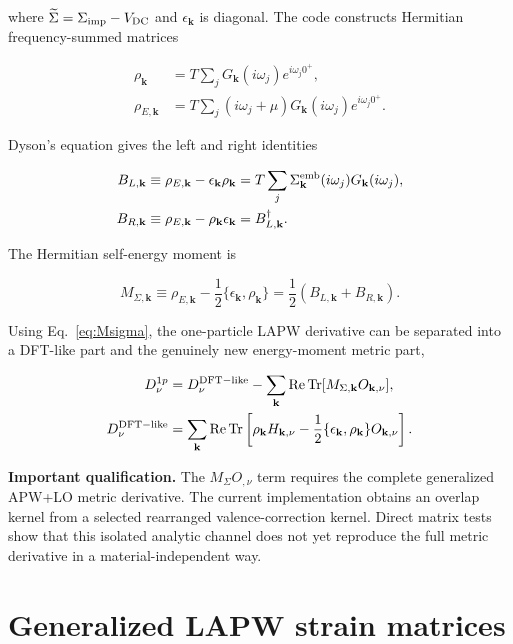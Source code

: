 \documentclass[11pt]{article}
\numberwithin{equation}{section}
\newcommand{\Tr}{\operatorname{Tr}}
\newcommand{\Ree}{\operatorname{Re}}
\newcommand{\kb}{\mathbf k}
\newcommand{\Sig}{\widetilde\Sigma}
\newcommand{\status}[2]{\par\medskip\noindent\colorbox{#1}{\parbox{0.965\linewidth}{#2}}\par\medskip}
\newcommand{\warningbox}[1]{\status{lightred}{\textbf{Important qualification.} #1}}
\begin{document}
where $\Sig=\Sigma_{\rm imp}-V_{\rm DC}$ and $\epsilon_{\kb}$ is diagonal.
The code constructs Hermitian frequency-summed matrices

\begin{align}
 \rho_{\kb}&=T\sum_jG_{\kb}(i\omega_j)e^{i\omega_j0^+},\\
 \rho_{E,\kb}&=T\sum_j(i\omega_j+\mu)
 G_{\kb}(i\omega_j)e^{i\omega_j0^+}.
 \label{eq:rhorhoE}
\end{align}

Dyson's equation gives the left and right identities

\begin{align}
 B_{L,\kb}&\equiv\rho_{E,\kb}-\epsilon_{\kb}\rho_{\kb}
 =T\sum_j\Sigma_{\kb}^{\rm emb}(i\omega_j)G_{\kb}(i\omega_j),\\
 B_{R,\kb}&\equiv\rho_{E,\kb}-\rho_{\kb}\epsilon_{\kb}
 =B_{L,\kb}^\dagger.
 \label{eq:BLBR}
\end{align}

The Hermitian self-energy moment is

\begin{equation}
 M_{\Sigma,\kb}
 \equiv\rho_{E,\kb}-\frac12\{\epsilon_{\kb},\rho_{\kb}\}
 =\frac12(B_{L,\kb}+B_{R,\kb}).
 \label{eq:Msigma}
\end{equation}

Using Eq.~\eqref{eq:Msigma}, the one-particle LAPW derivative can be separated
into a DFT-like part and the genuinely new energy-moment metric part,

\begin{align}
 D_\nu^{1p}
 &=D_\nu^{\rm DFT-like}
 -\sum_{\kb}\Ree\Tr[M_{\Sigma,\kb}O_{\kb,\nu}],\\
 D_\nu^{\rm DFT-like}
 &=\sum_{\kb}\Ree\Tr\left[
 \rho_{\kb}H_{\kb,\nu}
 -\frac12\{\epsilon_{\kb},\rho_{\kb}\}O_{\kb,\nu}
 \right].
 \label{eq:dftlike}
\end{align}

\warningbox{The $M_\Sigma O_{,\nu}$ term requires the complete generalized
APW+LO metric derivative.  The current implementation obtains an overlap
kernel from a selected rearranged valence-correction kernel.  Direct matrix
tests show that this isolated analytic channel does not yet reproduce the full
metric derivative in a material-independent way.}

\section{Generalized LAPW strain matrices}
\label{sec:TBO}
\end{document}
